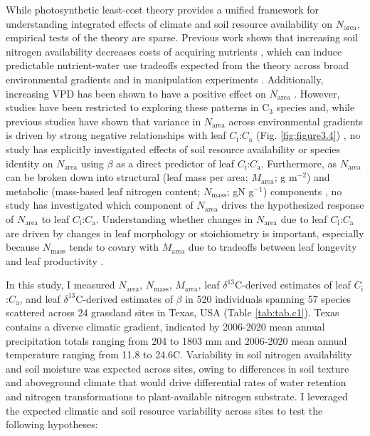 While photosynthetic least-cost theory provides a unified framework for understanding integrated effects of climate and soil resource availability on $N_\mathrm{area}$, empirical tests of the theory are sparse. Previous work shows that increasing soil nitrogen availability decreases costs of acquiring nutrients , which can induce predictable nutrient-water use tradeoffs expected from the theory across broad environmental gradients  and in manipulation experiments . Additionally, increasing VPD has been shown to have a positive effect on $N_\mathrm{area}$ . However, studies have been restricted to exploring these patterns in C$_3$ species and, while previous studies have shown that variance in $N_\mathrm{area}$ across environmental gradients is driven by strong negative relationships with leaf $C_\mathrm{i}$:$C_\mathrm{a}$ (Fig. \ref{fig:figure3.4}) , no study has explicitly investigated effects of soil resource availability or species identity on $N_\mathrm{area}$ using $\beta$ as a direct predictor of leaf $C_\mathrm{i}$:$C_\mathrm{a}$. Furthermore, as $N_\mathrm{area}$ can be broken down into structural (leaf mass per area; $M_\mathrm{area}$; g m$^{-2}$) and metabolic (mass-based leaf nitrogen content; $N_\mathrm{mass}$; gN g$^{-1}$) components , no study has investigated which component of $N_\mathrm{area}$ drives the hypothesized response of $N_\mathrm{area}$ to leaf $C_\mathrm{i}$:$C_\mathrm{a}$. Understanding whether changes in $N_\mathrm{area}$ due to leaf $C_\mathrm{i}$:$C_\mathrm{a}$ are driven by changes in leaf morphology or stoichiometry is important, especially because $N_\mathrm{mass}$ tends to covary with $M_\mathrm{area}$ due to tradeoffs between leaf longevity and leaf productivity .

In this study, I measured $N_\mathrm{area}$, $N_\mathrm{mass}$, $M_\mathrm{area}$, leaf $\delta^{13}$C-derived estimates of leaf $C_\mathrm{i}$:$C_\mathrm{a}$, and leaf $\delta^{13}$C-derived estimates of $\beta$ in 520 individuals spanning 57 species scattered across 24 grassland sites in Texas, USA (Table \ref{tab:tab.c1}). Texas contains a diverse climatic gradient, indicated by 2006-2020 mean annual precipitation totals ranging from 204 to 1803 mm and 2006-2020 mean annual temperature ranging from 11.8\textdegree{} to 24.6\textdegree{}C. Variability in soil nitrogen availability and soil moisture was expected across sites, owing to differences in soil texture and aboveground climate that would drive differential rates of water retention and nitrogen transformations to plant-available nitrogen substrate. I leveraged the expected climatic and soil resource variability across sites to test the following hypotheses:

